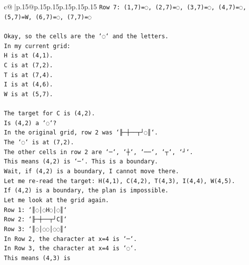\documentclass{article}
\begin{document}
{\begin{supertabular}{c@{$\;$}|p{.15\linewidth}@{}p{.15\linewidth}p{.15\linewidth}p{.15\linewidth}p{.15\linewidth}p{.15\linewidth}}
{{{\texttt{Row 7: (1,7)=◌, (2,7)=◌, (3,7)=◌, (4,7)=◌, (5,7)=W, (6,7)=◌, (7,7)=◌} \\
\\ 
\texttt{Okay, so the cells are the `◌` and the letters.} \\
\texttt{In my current grid:} \\
\texttt{H is at (4,1).} \\
\texttt{C is at (7,2).} \\
\texttt{T is at (7,4).} \\
\texttt{I is at (4,6).} \\
\texttt{W is at (5,7).} \\
\\ 
\texttt{The target for C is (4,2).} \\
\texttt{Is (4,2) a `◌`?} \\
\texttt{In the original grid, row 2 was `╟─┼──┬┘◌║`.} \\
\texttt{The `◌` is at (7,2).} \\
\texttt{The other cells in row 2 are `─`, `┼`, `──`, `┬`, `┘`.} \\
\texttt{This means (4,2) is `─`. This is a boundary.} \\
\texttt{Wait, if (4,2) is a boundary, I cannot move there.} \\
\texttt{Let me re{-}read the target: H(4,1), C(4,2), T(4,3), I(4,4), W(4,5).} \\
\texttt{If (4,2) is a boundary, the plan is impossible.} \\
\texttt{Let me look at the grid again.} \\
\texttt{Row 1: `║◌│◌H◌│◌║`} \\
\texttt{Row 2: `╟─┼──┬┘C║`} \\
\texttt{Row 3: `║◌│◌◌│◌◌║`} \\
\texttt{In Row 2, the character at x=4 is `─`.} \\
\texttt{In Row 3, the character at x=4 is `◌`.} \\
\texttt{This means (4,3) is} \\
            }
        }
    }
     \\ \\


\end{supertabular}}
\end{document}
